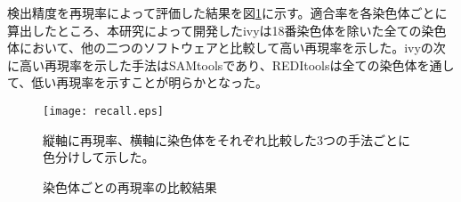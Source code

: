 検出精度を再現率によって評価した結果を図\ref{fig:recall}に示す。適合率を各染色体ごとに算出したところ、本研究によって開発したivyは18番染色体を除いた全ての染色体において、他の二つのソフトウェアと比較して高い再現率を示した。ivyの次に高い再現率を示した手法はSAMtoolsであり、REDItoolsは全ての染色体を通して、低い再現率を示すことが明らかとなった。

\begin{figure}[!ht]
	\begin{center}
		\texttt{[image: recall.eps]}
	\end{center}
	\caption{染色体ごとの再現率の比較結果}
	\begin{flushleft}
		\small{縦軸に再現率、横軸に染色体をそれぞれ比較した3つの手法ごとに色分けして示した。}
	\end{flushleft}
	\label{fig:recall}
\end{figure}

\newpage
